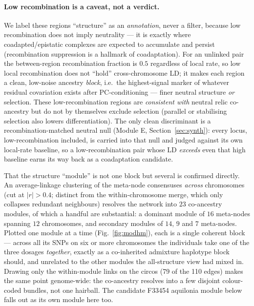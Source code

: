 \documentclass[11pt]{article}
\begin{document}
\paragraph{Low recombination is a caveat, not a verdict.} We label these regions
``structure'' as an \emph{annotation}, never a filter, because low recombination does not
imply neutrality --- it is exactly where coadapted/epistatic complexes are expected to
accumulate and persist (recombination suppression is a hallmark of coadaptation). For an
unlinked pair the between-region recombination fraction is $0.5$ regardless of local rate,
so low local recombination does not ``hold'' cross-chromosome LD; it makes each region a
clean, low-noise ancestry \emph{block}, i.e.\ the highest-signal marker of whatever
residual covariation exists after PC-conditioning --- finer neutral structure \emph{or}
selection. These low-recombination regions are \emph{consistent with} neutral relic
co-ancestry but do not by themselves exclude selection (parallel or stabilising selection
also lowers differentiation). The
only clean discriminant is a recombination-matched neutral null (Module E,
Section~\ref{sec:synth}): every locus, low-recombination included, is carried into that
null and judged against its own local-rate baseline, so a low-recombination pair whose LD
\emph{exceeds} even that high baseline earns its way back as a coadaptation candidate.

That the structure ``module'' is not one block but several is confirmed directly. An
average-linkage clustering of the meta-node consensuses \emph{across} chromosomes (cut at
$|r|>0.4$; distinct from the within-chromosome merge, which only collapses redundant
neighbours) resolves the network into $23$ co-ancestry modules, of which a handful are
substantial: a dominant module of $16$ meta-nodes spanning $12$ chromosomes, and secondary
modules of $14$, $9$ and $7$ meta-nodes. Plotted one module at a time
(Fig.~\ref{fig:modhm}), each is a single coherent block --- across all its SNPs on six or
more chromosomes the individuals take one of the three dosages \emph{together}, exactly as
a co-inherited admixture haplotype block should, and unrelated to the other modules the
all-structure view had mixed in. Drawing only the within-module links on the circos (79 of
the 110 edges) makes the same point genome-wide: the co-ancestry resolves into a few
disjoint colour-coded bundles, not one hairball. The candidate F33454 aquilonia module
below falls out as its own module here too.
\end{document}
